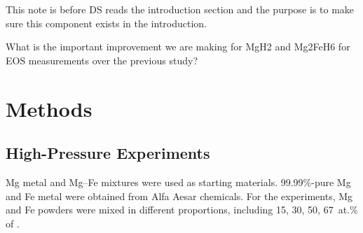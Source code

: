 \documentclass[draft,jgrga,12pt]{agujournal2019}
\begin{document}



\begin{cbox}
    This note is before DS reads the introduction section and the purpose is to make sure this component exists in the introduction.

    What is the important improvement we are making for MgH2 and Mg2FeH6 for EOS measurements over the previous study?\\
\end{cbox}


\section{Methods}

\subsection{High-Pressure Experiments}

Mg metal and Mg–Fe mixtures were used as starting materials.
99.99\%-pure Mg and Fe metal  were obtained from Alfa Aesar chemicals. 
For the  experiments, Mg and Fe powders were mixed  in different proportions, including 15, 30, 50,  67~{at.\%} of . 
\end{document}
